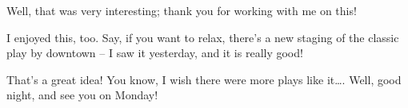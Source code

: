 \heroSTUDENT{} Well, that was very interesting; thank you for working with me
on this!

\heroADVISOR{} I enjoyed this, too. Say, if you want to relax, there's a new
staging of the classic play by \citet{fischer2010play} downtown -- I saw
it yesterday, and it is really good!

\heroSTUDENT{} That's a great idea! You know, I wish there were more plays
like it\ldots{}. Well, good night, and see you on Monday!
